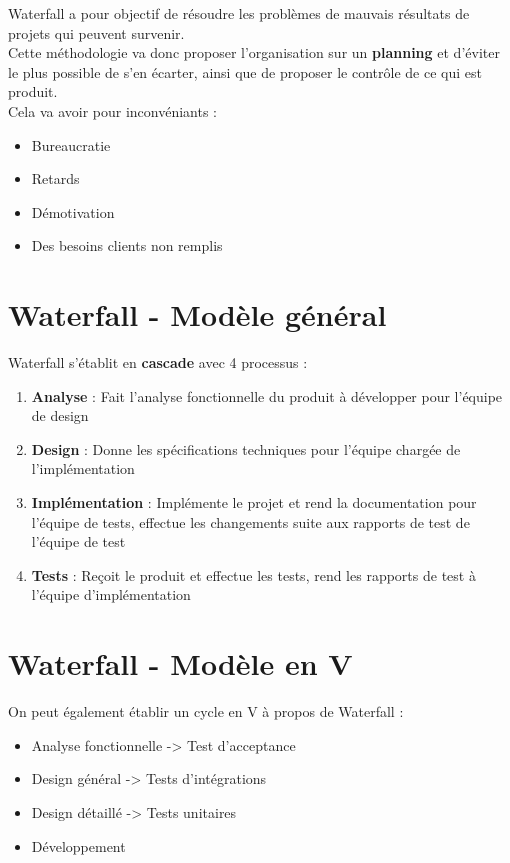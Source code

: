 \documentclass{report}
\begin{document}
		Waterfall a pour objectif de résoudre les problèmes de mauvais résultats de projets qui peuvent survenir.\\
		Cette méthodologie va donc proposer l'organisation sur un \textbf{planning} et d'éviter le plus possible de s'en écarter, ainsi que de proposer le contrôle de ce qui est produit.\\
		Cela va avoir pour inconvéniants : \\

		\begin{itemize}
			\item Bureaucratie
			\item Retards
			\item Démotivation
			\item Des besoins clients non remplis
		\end{itemize}

	\section{Waterfall - Modèle général}

		Waterfall s'établit en \textbf{cascade} avec 4 processus : \\

		\begin{enumerate}
			\item \textbf{Analyse} : Fait l'analyse fonctionnelle du produit à développer pour l'équipe de design
			\item \textbf{Design} : Donne les spécifications techniques pour l'équipe chargée de l'implémentation
			\item \textbf{Implémentation} : Implémente le projet et rend la documentation pour l'équipe de tests, effectue les changements suite aux rapports de test de l'équipe de test
			\item \textbf{Tests} : Reçoit le produit et effectue les tests, rend les rapports de test à l'équipe d'implémentation\\
		\end{enumerate}

	\section{Waterfall - Modèle en V}

		On peut également établir un cycle en V à propos de Waterfall : \\
		\begin{itemize}
			\item Analyse fonctionnelle -> Test d'acceptance
			\item Design général -> Tests d'intégrations
			\item Design détaillé -> Tests unitaires
			\item Développement
		\end{itemize}
\end{document}
